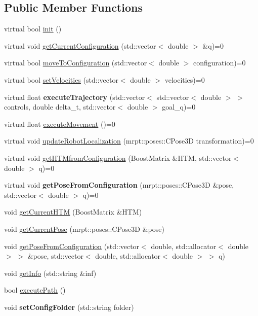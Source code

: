 \subsection*{Public Member Functions}
\begin{DoxyCompactItemize}
\item 
virtual bool \hyperlink{classvpRobot_a0442d8cd3c8fd883a9df619492b8835f}{init} ()
\item 
virtual void \hyperlink{classvpRobot_a4a234ba83e9c7155f645576775f10804}{get\+Current\+Configuration} (std\+::vector$<$ double $>$ \&q)=0
\item 
virtual bool \hyperlink{classvpRobot_a71bf1d8b8a81feacadf0164d080e87ce}{move\+To\+Configuration} (std\+::vector$<$ double $>$ configuration)=0
\item 
virtual bool \hyperlink{classvpRobot_a9c659e2e6f1eb3ed6996885dfb62b8cd}{set\+Velocities} (std\+::vector$<$ double $>$ velocities)=0
\item 
virtual float {\bfseries execute\+Trajectory} (std\+::vector$<$ std\+::vector$<$ double $>$ $>$ controls, double delta\+\_\+t, std\+::vector$<$ double $>$ goal\+\_\+q)=0\hypertarget{classvpRobot_a2120d527417292e9ddb87619a3446fe2}{}\label{classvpRobot_a2120d527417292e9ddb87619a3446fe2}

\item 
virtual float \hyperlink{classvpRobot_a7fa1eb51637125595e9a9c46d9b8449f}{execute\+Movement} ()=0
\item 
virtual void \hyperlink{classvpRobot_a92d30ca2e923a33e3fb33d5a9c0d3923}{update\+Robot\+Localization} (mrpt\+::poses\+::\+C\+Pose3D transformation)=0
\item 
virtual void \hyperlink{classvpRobot_a9518c5f60297d493673c96c3de1dd247}{get\+H\+T\+Mfrom\+Configuration} (Boost\+Matrix \&H\+TM, std\+::vector$<$ double $>$ q)=0
\item 
virtual void {\bfseries get\+Pose\+From\+Configuration} (mrpt\+::poses\+::\+C\+Pose3D \&pose, std\+::vector$<$ double $>$ q)=0\hypertarget{classvpRobot_add2ab1d988311df8723755b9cf68e5f7}{}\label{classvpRobot_add2ab1d988311df8723755b9cf68e5f7}

\item 
void \hyperlink{classvpRobot_a94cdcc0feed9a2b04eadb996320969d0}{get\+Current\+H\+TM} (Boost\+Matrix \&H\+TM)
\item 
void \hyperlink{classvpRobot_a31725952bb80fd0f0a313cdb2024ea7b}{get\+Current\+Pose} (mrpt\+::poses\+::\+C\+Pose3D \&pose)
\item 
void \hyperlink{classvpRobot_a9b94d096fe152c1b02bde3fb474b7d4a}{get\+Pose\+From\+Configuration} (std\+::vector$<$ double, std\+::allocator$<$ double $>$ $>$ \&pose, std\+::vector$<$ double, std\+::allocator$<$ double $>$ $>$ q)
\item 
void \hyperlink{classvpRobot_a7241b4e2d1d6140adda98735ef2d9be6}{get\+Info} (std\+::string \&inf)
\item 
bool \hyperlink{classvpRobot_a7ff01aeefda9d80e328fe717262721b2}{execute\+Path} ()
\item 
void {\bfseries set\+Config\+Folder} (std\+::string folder)\hypertarget{classvpRobot_a4a20b000e5596904b264835be5b34c2b}{}\label{classvpRobot_a4a20b000e5596904b264835be5b34c2b}


\end{DoxyCompactItemize}
